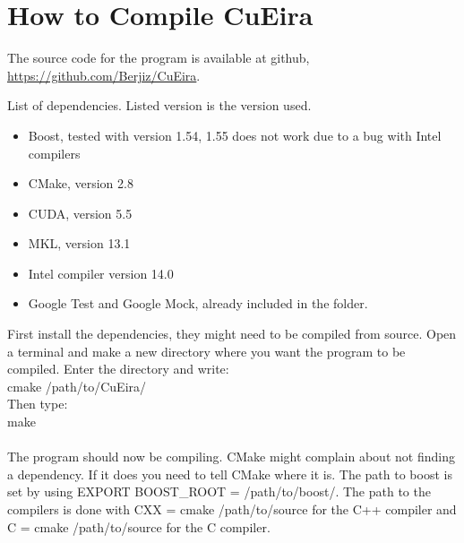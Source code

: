\documentclass[10pt,a4paper]{report}
\begin{document}
\section{How to Compile CuEira}
\label{compile_cueira}
The source code for the program is available at github, \url{https://github.com/Berjiz/CuEira}.

\begin{description}
    \item[List of dependencies. Listed version is the version used.]
\end{description}
\begin{itemize}
 \item Boost, tested with version 1.54, 1.55 does not work due to a bug with Intel compilers
 \item CMake, version 2.8
 \item CUDA, version 5.5
 \item MKL, version 13.1
 \item Intel compiler version 14.0
 \item Google Test and Google Mock, already included in the folder.
\end{itemize}

First install the dependencies, they might need to be compiled from source. Open a terminal and make a new directory where you want the program to be compiled. Enter the directory and write:\\
cmake /path/to/CuEira/\\
Then type:\\
make\\
\\
The program should now be compiling. CMake might complain about not finding a dependency. If it does you need to tell CMake where it is. The path to boost is set by using EXPORT BOOST\_ROOT = /path/to/boost/. The path to the compilers is done with CXX = cmake /path/to/source for the C++ compiler and C = cmake /path/to/source for the C compiler.


\newpage


\end{document}

